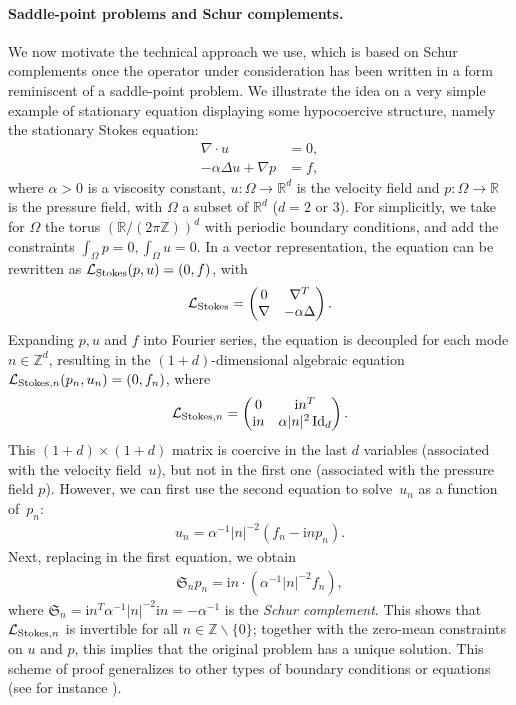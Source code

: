 \documentclass{article}
\newcommand{\ri}{\mathrm{i}}
\newcommand{\R}{\mathbb{R}}
\begin{document}
\paragraph{Saddle-point problems and Schur complements.}
We now motivate the technical approach we use, which is based on Schur complements once the operator under consideration has been written in a form reminiscent of a saddle-point problem. We illustrate the idea on a very simple example of stationary equation displaying some hypocoercive structure, namely the stationary Stokes equation:
\begin{align*}
  \nabla\cdot u &= 0, \\
  -\alpha \Delta u + \nabla p &= f,
\end{align*}
where $\alpha > 0$ is a viscosity constant, $u : \Omega \to \R^{d}$ is
the velocity field and $p : \Omega \to \R$ is the pressure field, with
$\Omega$ a subset of $\R^{d}$ ($d = 2$ or $3$). For simplicitly, we
take for $\Omega$ the torus $(\R/(2\pi\mathbb{Z}))^{d}$ with periodic
boundary conditions, and add the constraints
$\int_{\Omega} p =0, \int_{\Omega} u = 0$. In a vector representation,
the equation can be rewritten as
$\mathcal L_{\rm Stokes} (p,u) = (0,f)$, with
\begin{align*}
  \mathcal{L}_{\rm Stokes} = 
  \begin{pmatrix}
    0 & \nabla^{T}\\
    \nabla & -\alpha \Delta
  \end{pmatrix}.
\end{align*}
Expanding $p,u$ and $f$ into Fourier series, the equation is decoupled
for each mode $n \in \mathbb Z^{d}$, resulting in the
$(1+d)$-dimensional algebraic equation
$\mathcal L_{{\rm Stokes},n} (p_{n},u_{n}) = (0,f_{n})$, where
\begin{align*}
  \mathcal{L}_{{\rm Stokes},n} =
  \begin{pmatrix}
    0 & \ri n^{T}\\
    \ri n & \alpha |n|^{2}\, {\rm Id}_{d}
  \end{pmatrix}.
\end{align*}
This $(1+d)\times (1+d)$ matrix is coercive in the last $d$ variables
(associated with the velocity field~$u$), but not in the first one
(associated with the pressure field $p$). However, we can first use
the second equation to solve~$u_{n}$ as a function of~$p_{n}$:
\begin{align*}
  u_{n} = \alpha^{-1} |n|^{-2}(f_{n} - \ri n  p_{n}).
\end{align*}
Next, replacing in the first equation, we obtain
\begin{align*}
  \mathfrak{S}_n p_{n} = \ri n \cdot (\alpha^{-1} |n|^{-2} f_{n}),
\end{align*}
where
$\mathfrak{S}_n = \ri n^{T} \alpha^{-1} |n|^{-2} \ri n = -\alpha^{-1}$
is the \textit{Schur complement}. This shows that
$\mathcal{L}_{{\rm Stokes},n}$ is invertible for all
$n \in \mathbb{Z} \backslash \{0\}$; together with the zero-mean
constraints on $u$ and $p$, this implies that the original problem has
a unique solution. This scheme of proof generalizes to other types of
boundary conditions or equations (see for instance
\cite[Section 2.4]{ern2013theory}).
\end{document}
